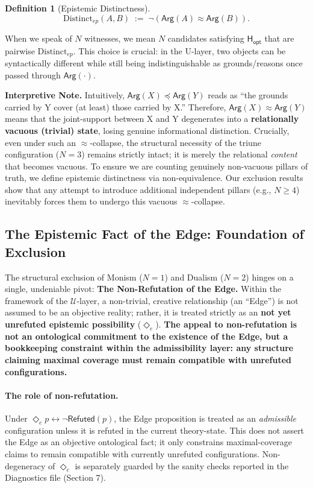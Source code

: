 \documentclass[a4paper, 11pt]{article}
\theoremstyle{plain}
\theoremstyle{definition}
\newtheorem{definition}{Definition}[section]
\newcommand{\U}{\mathcal{U}}               %
\newcommand{\Arg}{\mathsf{Arg}}           %
\newcommand{\Hopt}{\mathsf{H_{opt}}}       %
\newcommand{\Refuted}{\mathsf{Refuted}}   %
\newcommand{\diamondE}{\Diamond_{e}}      %
\begin{document}
\begin{definition}[Epistemic Distinctness]
\[
\text{Distinct}_{ep}(A,B) \;:=\; \neg(\Arg(A)\approx \Arg(B)).
\]
\end{definition}

\noindent
When we speak of $N$ witnesses, we mean $N$ candidates satisfying $\Hopt$ that are pairwise $\text{Distinct}_{ep}$.
This choice is crucial: in the U-layer, two objects can be syntactically different while still being indistinguishable as grounds/reasons once passed through $\Arg(\cdot)$.

\medskip
\noindent\textbf{Interpretive Note.} Intuitively, $\Arg(X) \preceq \Arg(Y)$ reads as ``the grounds carried by Y cover (at least) those carried by X.'' Therefore, $\Arg(X) \approx \Arg(Y)$ means that the joint-support between X and Y degenerates into a \textbf{relationally vacuous (trivial) state}, losing genuine informational distinction. Crucially, even under such an $\approx$-collapse, the structural necessity of the triune configuration ($N=3$) remains strictly intact; it is merely the relational \emph{content} that becomes vacuous. To ensure we are counting genuinely non-vacuous pillars of truth, we define epistemic distinctness via non-equivalence. Our exclusion results show that any attempt to introduce additional independent pillars (e.g., $N \ge 4$) inevitably forces them to undergo this vacuous $\approx$-collapse.


\subsection{The Epistemic Fact of the Edge: Foundation of Exclusion}
The structural exclusion of Monism ($N=1$) and Dualism ($N=2$) hinges on a single, undeniable pivot: \textbf{The Non-Refutation of the Edge.} Within the framework of the $\U$-layer, a non-trivial, creative relationship (an ``Edge'') is not assumed to be an objective reality; rather, it is treated strictly as an \textbf{not yet unrefuted epistemic possibility} ($\diamondE$). \textbf{The appeal to non-refutation is not an ontological commitment to the existence of the Edge, but a bookkeeping constraint within the admissibility layer: any structure claiming maximal coverage must remain compatible with unrefuted configurations.}

\paragraph{The role of non-refutation.}
Under $\diamondE p \leftrightarrow \neg\Refuted(p)$, the Edge proposition is treated as an \emph{admissible} configuration unless it is refuted in the current theory-state.
This does not assert the Edge as an objective ontological fact; it only constrains maximal-coverage claims to remain compatible with currently unrefuted configurations.
Non-degeneracy of $\diamondE$ is separately guarded by the sanity checks reported in the Diagnostics file (Section 7).
\end{document}
